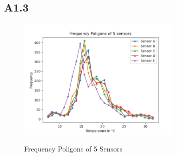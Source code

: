 \documentclass[a4paper,12pt]{article}
\begin{document}
 \subsection{A1.3}
  \begin{figure}[H] 
	\centering
	\includegraphics[width=0.7\textwidth]{Frequency Poligons of 5 Sensors.png}
	\caption{Frequency Poligons of 5 Sensors}\cite{Maiullari2020}
  \end{figure}
\end{document}
